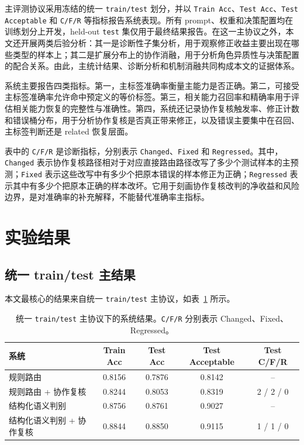 \documentclass[11pt,a4paper]{ctexart}
\begin{document}
主评测协议采用冻结的统一 \texttt{train/test} 划分，并以 \texttt{Train Acc}、\texttt{Test Acc}、\texttt{Test Acceptable} 和 \texttt{C/F/R} 等指标报告系统表现。所有 prompt、权重和决策配置均在训练划分上开发，held-out \texttt{test} 集仅用于最终结果报告。在这一主协议之外，本文还开展两类后验分析：其一是诊断性子集分析，用于观察修正收益主要出现在哪些类型的样本上；其二是扩展分布上的协作消融，用于分析角色异质性与决策配置的配合关系。由此，主统计结果、诊断分析和机制消融共同构成本文的证据体系。

系统主要报告四类指标。第一，主标签准确率衡量主能力是否正确。第二，可接受主标签准确率允许命中预定义的等价标签。第三，相关能力召回率和精确率用于评估相关能力恢复的完整性与准确性。第四，系统还记录协作复核触发率、修正计数和错误桶分布，用于分析协作复核是否真正带来修正，以及错误主要集中在召回、主标签判断还是 related 恢复层面。

表中的 \texttt{C/F/R} 是诊断指标，分别表示 \texttt{Changed}、\texttt{Fixed} 和 \texttt{Regressed}。其中，\texttt{Changed} 表示协作复核路径相对于对应直接路由路径改写了多少个测试样本的主预测；\texttt{Fixed} 表示这些改写中有多少个把原本错误的样本修正为正确；\texttt{Regressed} 表示其中有多少个把原本正确的样本改坏。它用于刻画协作复核改判的净收益和风险边界，是对准确率的补充解释，不能替代准确率主指标。

\section{实验结果}

\subsection{统一 train/test 主结果}

本文最核心的结果来自统一 \texttt{train/test} 主协议，如表~\ref{tab:pooled-main} 所示。

\begin{table}[H]
\centering
\caption{统一 \texttt{train/test} 主协议下的系统结果。\texttt{C/F/R} 分别表示 Changed、Fixed、Regressed。}
\label{tab:pooled-main}
\begin{tabular}{lcccc}
\toprule
系统 & Train Acc & Test Acc & Test Acceptable & Test C/F/R \\
\midrule
规则路由 & 0.8156 & 0.7876 & 0.8142 & -- \\
规则路由 + 协作复核 & 0.8244 & 0.8053 & 0.8319 & 2 / 2 / 0 \\
结构化语义判别 & 0.8756 & 0.8761 & 0.9027 & -- \\
结构化语义判别 + 协作复核 & 0.8844 & 0.8850 & 0.9115 & 1 / 1 / 0 \\
\bottomrule
\end{tabular}
\end{table}
\end{document}
